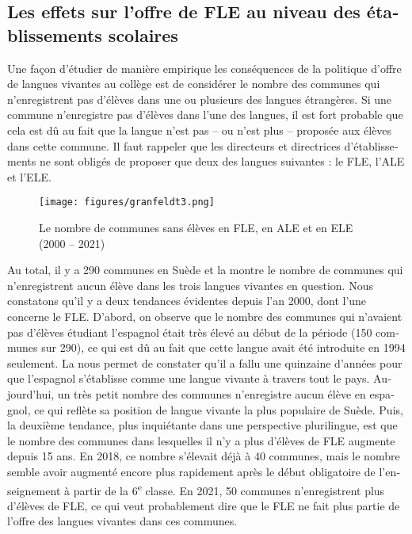 \documentclass[french, output=paper]{langscibook}
\begin{document}
\begin{otherlanguage}{french}
\subsection{Les effets sur l’offre de FLE au niveau des établissements scolaires}\label{sec:granfeldt:4.2}

Une façon d’étudier de manière empirique les conséquences de la politique d’offre de langues vivantes au collège est de considérer le nombre des communes qui n’enregistrent pas d’élèves dans une ou plusieurs des langues étrangères. Si une commune n’enregistre pas d’élèves dans l’une des langues, il est fort probable que cela est dû au fait que la langue n’est pas -- ou n’est plus -- proposée aux élèves dans cette commune. Il faut rappeler que les {directeurs et directrices d’établissements} ne sont obligés de proposer que deux des langues suivantes : le FLE, l’ALE et l’ELE. 

  
 

\begin{figure}
\texttt{[image: figures/granfeldt3.png]}
\caption{Le nombre de communes sans élèves en FLE, en ALE et en ELE (2000 -- 2021)}
\label{fig:granfeldt:3}
\end{figure}

Au total, il y a 290 communes en Suède et la  montre le nombre de communes qui n’enregistrent aucun élève dans les trois langues vivantes en question. Nous constatons qu’il y a deux tendances évidentes depuis l’an 2000, dont l’une concerne le FLE. D’abord, on observe que le nombre des communes qui n’avaient pas d’élèves étudiant l’espagnol était très élevé au début de la période (150 communes sur 290), ce qui est dû au fait que cette langue avait été introduite en 1994 seulement. La  nous permet de constater qu’il a fallu une quinzaine d’années pour que l’espagnol s’établisse comme une langue vivante à travers tout le pays. Aujourd’hui, un très petit nombre des communes n’enregistre aucun élève en espagnol, ce qui reflète sa position de langue vivante la plus populaire de Suède. Puis, la deuxième tendance, plus inquiétante dans une perspective plurilingue, est que le nombre des communes dans lesquelles il n’y a plus d’élèves de FLE augmente depuis 15 ans. En 2018, ce nombre s’élevait déjà à 40 communes, mais le nombre semble avoir augmenté encore plus rapidement après le début obligatoire de l’enseignement à partir de la 6\textsuperscript{e} classe. En 2021, 50 communes n’enregistrent plus d’élèves de FLE, ce qui veut probablement dire que le FLE ne fait plus partie de l’offre des langues vivantes dans ces communes. 


\end{otherlanguage}
\end{document}
